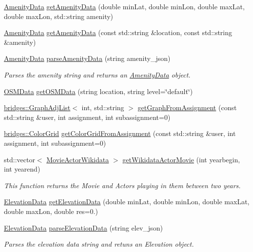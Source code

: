 \begin{DoxyCompactItemize}
\hyperlink{class_amenity_data}{Amenity\+Data} \hyperlink{classbridges_1_1_data_source_a3ae31729bc8c4154dc091f89e9b7349e}{get\+Amenity\+Data} (double min\+Lat, double min\+Lon, double max\+Lat, double max\+Lon, std\+::string amenity)
\item 
\hyperlink{class_amenity_data}{Amenity\+Data} \hyperlink{classbridges_1_1_data_source_a457c6a6417de36ec36040cc2b7703cb2}{get\+Amenity\+Data} (const std\+::string \&location, const std\+::string \&amenity)
\item 
\hyperlink{class_amenity_data}{Amenity\+Data} \hyperlink{classbridges_1_1_data_source_a04bebf8bfda48d1dc0e6c6e90fac8fbc}{parse\+Amenity\+Data} (string amenity\+\_\+json)
\begin{DoxyCompactList}\small\item\em Parses the amenity string and returns an \hyperlink{class_amenity_data}{Amenity\+Data} object. \end{DoxyCompactList}\item 
\hyperlink{classbridges_1_1dataset_1_1_o_s_m_data}{O\+S\+M\+Data} \hyperlink{classbridges_1_1_data_source_a3151f5b2a27b5d6b11e1c5cb55d51655}{get\+O\+S\+M\+Data} (string location, string level=\char`\"{}default\char`\"{})
\item 
\hyperlink{classbridges_1_1datastructure_1_1_graph_adj_list}{bridges\+::\+Graph\+Adj\+List}$<$ int, std\+::string $>$ \hyperlink{classbridges_1_1_data_source_ac4edf55c163c60f17b13f5499e5d2e65}{get\+Graph\+From\+Assignment} (const std\+::string \&user, int assignment, int subassignment=0)
\item 
\hyperlink{classbridges_1_1datastructure_1_1_color_grid}{bridges\+::\+Color\+Grid} \hyperlink{classbridges_1_1_data_source_aa65136879011e1ec237380ef8587fea2}{get\+Color\+Grid\+From\+Assignment} (const std\+::string \&user, int assignment, int subassignment=0)
\item 
std\+::vector$<$ \hyperlink{classbridges_1_1dataset_1_1_movie_actor_wikidata}{Movie\+Actor\+Wikidata} $>$ \hyperlink{classbridges_1_1_data_source_a25b33736b4ae9ffea5fe4ebf5dbb3a63}{get\+Wikidata\+Actor\+Movie} (int yearbegin, int yearend)
\begin{DoxyCompactList}\small\item\em This function returns the Movie and Actors playing in them between two years. \end{DoxyCompactList}\item 
\hyperlink{classbridges_1_1dataset_1_1_elevation_data}{Elevation\+Data} \hyperlink{classbridges_1_1_data_source_ac10b2fc8f5038adceb8e350be09ab52b}{get\+Elevation\+Data} (double min\+Lat, double min\+Lon, double max\+Lat, double max\+Lon, double res=0.)
\item 
\hyperlink{classbridges_1_1dataset_1_1_elevation_data}{Elevation\+Data} \hyperlink{classbridges_1_1_data_source_a84f1c70c6dd5be2f3df97015025c0dd3}{parse\+Elevation\+Data} (string elev\+\_\+json)
\begin{DoxyCompactList}\small\item\em Parses the elevation data string and retuns an Elevation object. \end{DoxyCompactList}\end{DoxyCompactItemize}


